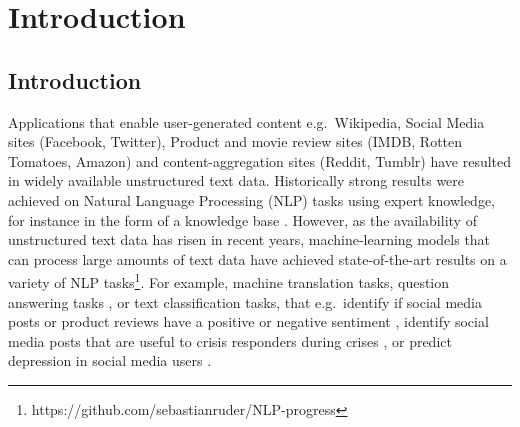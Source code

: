 \chapter{Introduction}\label{ch1}





\section{Introduction}



Applications that enable user-generated content e.g.\ Wikipedia, Social Media sites (Facebook, Twitter), Product and movie review sites (IMDB, Rotten Tomatoes, Amazon) and content-aggregation sites (Reddit, Tumblr) have resulted in widely available unstructured text data. Historically strong results were achieved on Natural Language Processing (NLP) tasks using expert knowledge, for instance in the form of a knowledge base \cite{Lewis1993}. However, as the availability of unstructured text data has risen in recent years, machine-learning models that can process large amounts of  text  data have achieved state-of-the-art results on  a variety of NLP tasks\footnote{https://github.com/sebastianruder/NLP-progress}. For example, machine translation \cite{Wu} tasks, question answering tasks \cite{Fisch2016}, or text classification tasks, that e.g.\  identify if social media posts or product reviews have a positive or negative sentiment \cite{Burel2018},  identify social media posts  that are useful to crisis responders during crises \cite{Burel2018}, or  predict depression in social media users \cite{Aldarwish2017}. 



